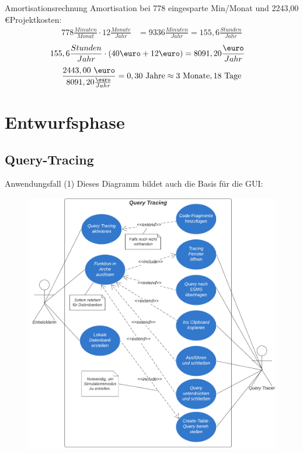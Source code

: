\documentclass[toc]{beamer}
\begin{document}
    
    \begin{frame}{Amortisationsrechnung}
   Amortisation bei 778 eingesparte Min/Monat und 2243,00 \euro\space Projektkosten:
    \begin{align}
    778\frac{Minuten}{Monat}\cdot 12\frac{Monate}{Jahr}&=9336\frac{Minuten}{Jahr}=155,6\frac{Stunden}{Jahr}
\end{align}
\begin{align}
    155,6\frac{Stunden}{Jahr}\cdot(40 \text{\euro} + 12 \text{\euro})&=8091,20\frac{\text{\euro}}{Jahr}
\end{align}
\begin{align}
    \frac{2443,00 \text{ \euro}}{8091,20 \frac{\text{\euro}}{Jahr}}=0,30 \text{ Jahre}
    \approx 3 \text{ Monate}, 18 \text{ Tage}
\end{align}%
    \end{frame}

\section{Entwurfsphase}
    \subsection{Query-Tracing}
        \begin{frame}{Anwendungsfall (1)}
        Dieses Diagramm bildet auch die Basis für die GUI:
            \begin{figure}[htp]
                   \includegraphics[scale=0.67]{Anwendungsfalldiagramm_2.png}
                    
                    \end{figure}
        \end{frame}
        
\end{document}
